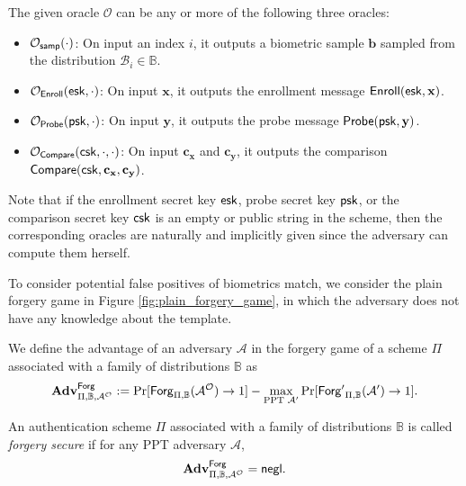 The given oracle $\mathcal{O}$ can be any or more of the following three oracles:

\begin{itemize}

	\item $\mathcal{O}_{\sf samp}(\cdot)$: On input an index $i$, it outputs a biometric sample $\mathbf{b}$ sampled from the distribution $\mathcal{B}_i \in \mathbb{B}$.

	\item $\mathcal{O}_{\sf Enroll}({\sf esk}, \cdot)$: On input $\mathbf{x}$, it outputs the enrollment message ${\sf Enroll}({\sf esk}, \mathbf{x})$.

	\item $\mathcal{O}_{\sf Probe}({\sf psk}, \cdot)$: On input $\mathbf{y}$, it outputs the probe message ${\sf Probe}({\sf psk}, \mathbf{y})$.

	\item $\mathcal{O}_{\sf Compare}({\sf csk}, \cdot, \cdot)$: On input $\mathbf{c_x}$ and $\mathbf{c_y}$, it outputs the comparison ${\sf Compare}( {\sf csk}, \mathbf{c_x}, \mathbf{c_y} )$.

\end{itemize}

Note that if the enrollment secret key ${\sf esk}$, probe secret key ${\sf psk}$, or the comparison secret key ${\sf csk}$ is an empty or public string in the scheme, then the corresponding oracles are naturally and implicitly given since the adversary can compute them herself. 

To consider potential false positives of biometrics match, we consider the plain forgery game in Figure \ref{fig:plain_forgery_game}, in which the adversary does not have any knowledge about the template. 

We define the advantage of an adversary $\mathcal{A}$ in the forgery game of a scheme $\Pi$ associated with a family of distributions $\mathbb{B}$ as
\[
	\mathbf{Adv}^{\sf Forg}_{\Pi, \mathbb{B}, \mathcal{A}^\mathcal{O}} := \Pr[{\sf Forg}_{\Pi, \mathbb{B}}(\mathcal{A}^\mathcal{O}) \to 1] -
	\max_{\text{PPT } \mathcal{A}'} \Pr[{\sf Forg'}_{\Pi, \mathbb{B}}(\mathcal{A}') \to 1].
\]

An authentication scheme $\Pi$ associated with a family of distributions $\mathbb{B}$ is called \emph{forgery secure} if for any PPT adversary $\mathcal{A}$,
\[
	\mathbf{Adv}^{\sf Forg}_{\Pi, \mathbb{B}, \mathcal{A^\mathcal{O}}} = \mathsf{negl}.
\]



